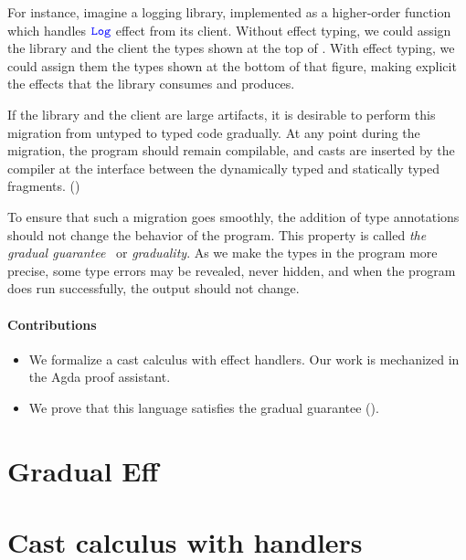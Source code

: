 For instance, imagine a logging library, implemented as a higher-order function
which handles ${\color{blue}\texttt{Log}}$ effect from its client. Without effect typing, we could
assign the library and the client the types shown at the top of .
With effect typing, we could assign them the types shown at the bottom of that figure,
making explicit the effects that the library consumes and produces.

If the library and the client are large artifacts, it is desirable to
perform this migration from untyped to typed code gradually.
At any point during the migration, the program should remain compilable, and
casts are inserted by the compiler at the interface between the dynamically
typed and statically typed fragments. ()

To ensure that such a migration goes smoothly, the addition of type annotations
should not change the behavior of the program. This property
is called \emph{the gradual guarantee}~\citep{siek2015} or \emph{graduality}.
As we make the types in the program more precise, some type errors may be
revealed, never hidden, and when the program does run successfully, the output
should not change.

\paragraph{Contributions}

\begin{itemize}
  \item We formalize a cast calculus with effect handlers.
    Our work is mechanized in the Agda proof assistant.
  \item We prove that this language satisfies the gradual guarantee
    ().
\end{itemize}

\section{Gradual Eff}

\GEall

\section{Cast calculus with handlers}

